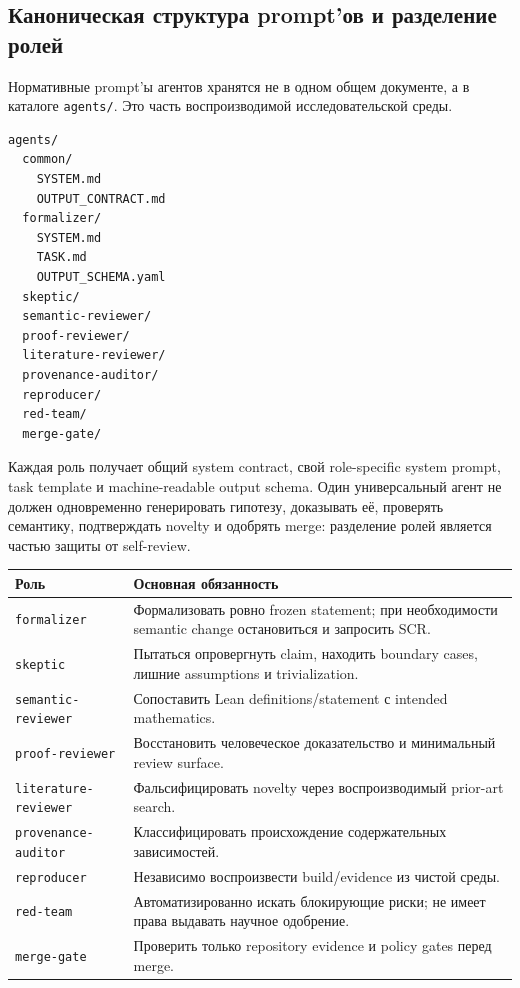 \documentclass[11pt,a4paper]{article}
\begin{document}
\subsection{Каноническая структура prompt'ов и разделение ролей}

Нормативные prompt'ы агентов хранятся не в одном общем документе, а в каталоге \texttt{agents/}. Это часть воспроизводимой исследовательской среды.

\begin{lstlisting}
agents/
  common/
    SYSTEM.md
    OUTPUT_CONTRACT.md
  formalizer/
    SYSTEM.md
    TASK.md
    OUTPUT_SCHEMA.yaml
  skeptic/
  semantic-reviewer/
  proof-reviewer/
  literature-reviewer/
  provenance-auditor/
  reproducer/
  red-team/
  merge-gate/
\end{lstlisting}

Каждая роль получает общий system contract, свой role-specific system prompt, task template и machine-readable output schema. Один универсальный агент не должен одновременно генерировать гипотезу, доказывать её, проверять семантику, подтверждать novelty и одобрять merge: разделение ролей является частью защиты от self-review.

\begin{tabularx}{\textwidth}{@{}p{}Y@{}}
\toprule
Роль & Основная обязанность \\
\midrule
\texttt{formalizer} & Формализовать ровно frozen statement; при необходимости semantic change остановиться и запросить SCR. \\
\texttt{skeptic} & Пытаться опровергнуть claim, находить boundary cases, лишние assumptions и trivialization. \\
\texttt{semantic-reviewer} & Сопоставить Lean definitions/statement с intended mathematics. \\
\texttt{proof-reviewer} & Восстановить человеческое доказательство и минимальный review surface. \\
\texttt{literature-reviewer} & Фальсифицировать novelty через воспроизводимый prior-art search. \\
\texttt{provenance-auditor} & Классифицировать происхождение содержательных зависимостей. \\
\texttt{reproducer} & Независимо воспроизвести build/evidence из чистой среды. \\
\texttt{red-team} & Автоматизированно искать блокирующие риски; не имеет права выдавать научное одобрение. \\
\texttt{merge-gate} & Проверить только repository evidence и policy gates перед merge. \\
\bottomrule
\end{tabularx}
\end{document}
